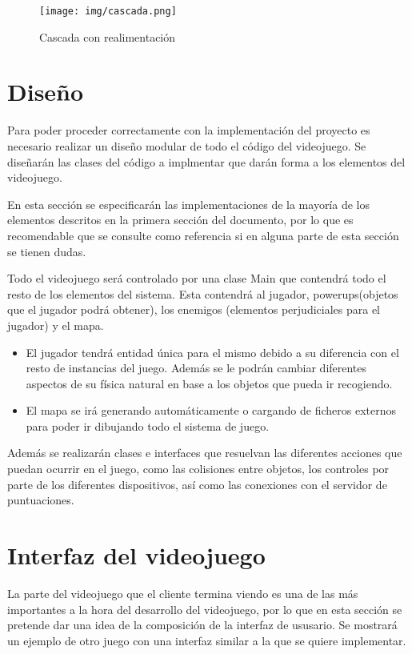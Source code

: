 \documentclass[palatino]{apuntes}
\begin{document}
\begin{figure}[hbtp]
    \centering
    \texttt{[image: img/cascada.png]}
    \caption{Cascada con realimentación}
    \label{fig:cascadarealimentacion}
\end{figure}


\section{Diseño}

Para poder proceder correctamente con la implementación del proyecto es necesario realizar un diseño modular de todo el código del videojuego. Se diseñarán las clases del código a implmentar que darán forma a los elementos del videojuego.

En esta sección se especificarán las implementaciones de la mayoría de los elementos descritos en la primera sección del documento, por lo que es recomendable que se consulte como referencia si en alguna parte de esta sección se tienen dudas.

Todo el videojuego será controlado por una clase Main que contendrá todo el resto de los elementos del sistema. Esta contendrá al jugador, powerups(objetos que el jugador podrá obtener), los enemigos (elementos perjudiciales para el jugador) y el mapa.

\begin{itemize}
    \item El jugador tendrá entidad única para el mismo debido a su diferencia con el resto de instancias del juego. Además se le podrán cambiar diferentes aspectos de su física natural en base a los objetos que pueda ir recogiendo.

    \item El mapa se irá generando automáticamente o cargando de ficheros externos para poder ir dibujando todo el sistema de juego.
\end{itemize}

Además se realizarán clases e interfaces que resuelvan las diferentes acciones que puedan ocurrir en el juego, como las colisiones entre objetos, los controles por parte de los diferentes dispositivos, así como las conexiones con el servidor de puntuaciones.


\section{Interfaz del videojuego}
La parte del videojuego que el cliente termina viendo es una de las más importantes a la hora del desarrollo del videojuego, por lo que en esta sección se pretende dar una idea de la composición de la interfaz de ususario. Se mostrará un ejemplo de otro juego con una interfaz similar a la que se quiere implementar.
\end{document}
